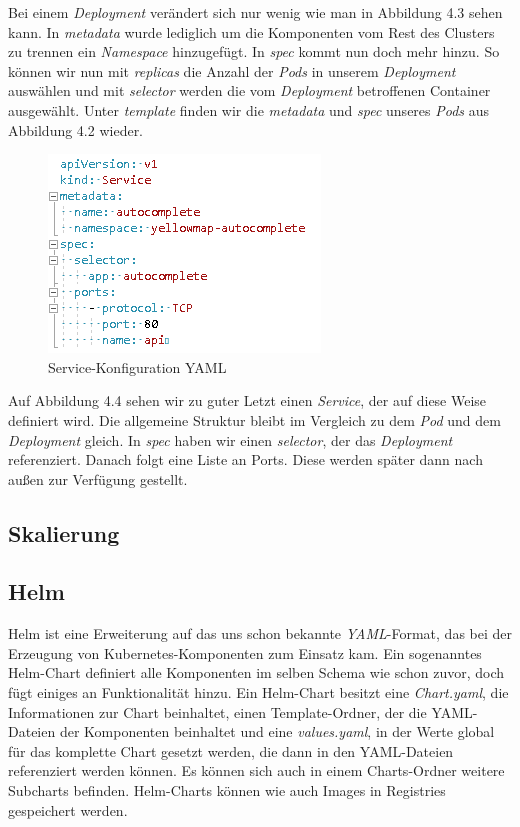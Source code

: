 \documentclass[12pt,a4paper]{scrartcl}
\begin{document}
Bei einem \emph{Deployment} verändert sich nur wenig wie man in Abbildung 4.3 sehen kann. In \emph{metadata} wurde lediglich um die Komponenten vom Rest des Clusters zu trennen ein \emph{Namespace} hinzugefügt. In \emph{spec} kommt nun doch mehr hinzu. So können wir nun mit \emph{replicas} die Anzahl der \emph{Pods} in unserem \emph{Deployment} auswählen und mit \emph{selector} werden die vom \emph{Deployment} betroffenen Container ausgewählt. Unter \emph{template} finden wir die \emph{metadata} und \emph{spec} unseres \emph{Pods} aus Abbildung 4.2 wieder.

\begin{figure}[h!]
	\centering
	\includegraphics[scale=1]{KubeYmlSvc.png}
	\caption[Screenshot]{Service-Konfiguration YAML}
\end{figure}

Auf Abbildung 4.4 sehen wir zu guter Letzt einen \emph{Service}, der auf diese Weise definiert wird. Die allgemeine Struktur bleibt im Vergleich zu dem \emph{Pod} und dem \emph{Deployment} gleich. In \emph{spec} haben wir einen \emph{selector}, der das \emph{Deployment} referenziert. Danach folgt eine Liste an Ports. Diese werden später dann nach außen zur Verfügung gestellt.

\subsection{Skalierung} 



\subsection{Helm}

Helm ist eine Erweiterung auf das uns schon bekannte \emph{YAML}-Format, das bei der Erzeugung von Kubernetes-Komponenten zum Einsatz kam. Ein sogenanntes Helm-Chart definiert alle Komponenten im selben Schema wie schon zuvor, doch fügt einiges an Funktionalität hinzu. Ein Helm-Chart besitzt eine \emph{Chart.yaml}, die Informationen zur Chart beinhaltet, einen Template-Ordner, der die YAML-Dateien der Komponenten beinhaltet und eine \emph{values.yaml}, in der Werte global für das komplette Chart gesetzt werden, die dann in den YAML-Dateien referenziert werden können. Es können sich auch in einem Charts-Ordner weitere Subcharts befinden. Helm-Charts können wie auch Images in Registries gespeichert werden. 
\end{document}

